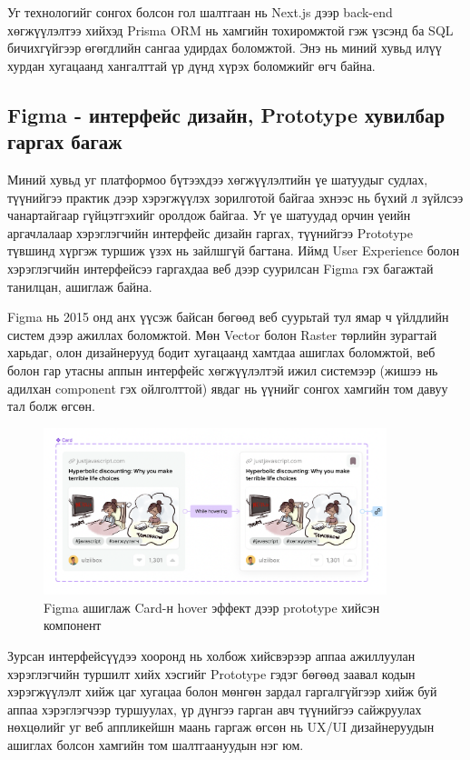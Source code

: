 Уг технологийг сонгох болсон гол шалтгаан нь Next.js дээр back-end хөгжүүлэлтээ хийхэд Prisma ORM нь хамгийн тохиромжтой гэж үзсэнд ба SQL бичихгүйгээр өгөгдлийн сангаа удирдах боломжтой. Энэ нь миний хувьд илүү хурдан хугацаанд хангалттай үр дүнд хүрэх боломжийг өгч байна.

\subsection{Figma - интерфейс дизайн, Prototype хувилбар гаргах багаж}

Миний хувьд уг платформоо бүтээхдээ хөгжүүлэлтийн үе шатуудыг судлах, түүнийгээ практик дээр хэрэгжүүлэх зорилготой байгаа эхнээс нь бүхий л зүйлсээ чанартайгаар гүйцэтгэхийг оролдож байгаа. Уг үе шатуудад орчин үеийн аргачлалаар хэрэглэгчийн интерфейс дизайн гаргах, түүнийгээ Prototype түвшинд хүргэж туршиж үзэх нь зайлшгүй багтана. Иймд User Experience болон хэрэглэгчийн интерфейсээ гаргахдаа веб дээр суурилсан Figma гэх багажтай танилцан, ашиглаж байна. 

Figma нь 2015 онд анх үүсэж байсан бөгөөд веб суурьтай тул ямар ч үйлдлийн систем дээр ажиллах боломжтой. Мөн Vector болон Raster төрлийн зурагтай харьдаг, олон дизайнерууд бодит хугацаанд хамтдаа ашиглах боломжтой, веб болон гар утасны аппын интерфейс хөгжүүлэлтэй ижил системээр (жишээ нь адилхан component гэх ойлголттой) явдаг нь үүнийг сонгох хамгийн том давуу тал болж өгсөн.


\begin{figure}[h]
	\centering
	\includegraphics[width=10cm]{images/figma-prototype.png}
	\caption{Figma ашиглаж Card-н hover эффект дээр prototype хийсэн компонент}
	\label{fig:figma}
\end{figure}

Зурсан интерфейсүүдээ хооронд нь холбож хийсвэрээр аппаа ажиллуулан хэрэглэгчийн туршилт хийх хэсгийг Prototype гэдэг бөгөөд заавал кодын хэрэгжүүлэлт хийж цаг хугацаа болон мөнгөн зардал гаргалгүйгээр хийж буй аппаа хэрэглэгчээр туршуулах, үр дүнгээ гарган авч түүнийгээ сайжруулах нөхцөлийг уг веб аппликейшн маань гаргаж өгсөн нь UX/UI дизайнеруудын ашиглах болсон хамгийн том шалтгаануудын нэг юм. 


